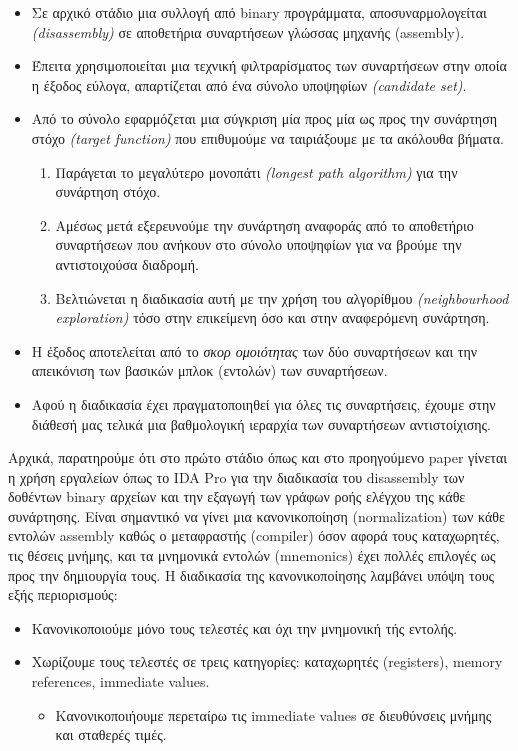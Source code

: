 \begin{itemize}
    \item Σε αρχικό στάδιο μια συλλογή από binary προγράμματα, αποσυναρμολογείται \emph{(disassembly)} σε αποθετήρια συναρτήσεων γλώσσας μηχανής (assembly).
    \item Έπειτα χρησιμοποιείται μια τεχνική φιλτραρίσματος των συναρτήσεων στην οποία η έξοδος εύλογα, απαρτίζεται από ένα σύνολο υποψηφίων \emph{(candidate set)}.
    \item Από το σύνολο εφαρμόζεται μια σύγκριση μία προς μία ως προς την συνάρτηση στόχο \emph{(target function)} που επιθυμούμε να ταιριάξουμε με τα ακόλουθα βήματα.
    \begin{enumerate}
        \item Παράγεται το μεγαλύτερο μονοπάτι \emph{(longest path algorithm)} για την συνάρτηση στόχο.
        \item Αμέσως μετά εξερευνούμε την συνάρτηση αναφοράς από το αποθετήριο συναρτήσεων που ανήκουν στο σύνολο υποψηφίων για να βρούμε την αντιστοιχούσα διαδρομή.
        \item Βελτιώνεται η διαδικασία αυτή με την χρήση του αλγορίθμου \emph{(neighbourhood exploration)} τόσο στην επικείμενη όσο και στην αναφερόμενη συνάρτηση.
    \end{enumerate}
    \item Η έξοδος αποτελείται από το \emph{σκορ ομοιότητας} των δύο συναρτήσεων και την απεικόνιση των βασικών μπλοκ (εντολών) των συναρτήσεων.
    \item Αφού η διαδικασία έχει πραγματοποιηθεί για όλες τις συναρτήσεις, έχουμε στην διάθεσή μας τελικά μια βαθμολογική ιεραρχία των συναρτήσεων αντιστοίχισης.
\end{itemize}
Αρχικά, παρατηρούμε ότι στο πρώτο στάδιο όπως και στο προηγούμενο paper γίνεται η χρήση εργαλείων όπως το IDA Pro για την διαδικασία του disassembly των δοθέντων binary αρχείων και την εξαγωγή των γράφων ροής ελέγχου της κάθε συνάρτησης.
Είναι σημαντικό να γίνει μια κανονικοποίηση (normalization) των κάθε εντολών assembly καθώς ο μεταφραστής (compiler) όσον αφορά τους καταχωρητές, τις θέσεις μνήμης, και τα μνημονικά εντολών (mnemonics) έχει πολλές επιλογές ως προς την δημιουργία τους.
Η διαδικασία της κανονικοποίησης λαμβάνει υπόψη τους εξής περιορισμούς:
\begin{itemize}
  \item Κανονικοποιούμε μόνο τους τελεστές και όχι την μνημονική τής εντολής.
  \item Χωρίζουμε τους τελεστές σε τρεις κατηγορίες: καταχωρητές (registers), memory references, immediate values.
    \begin{itemize}
      \item Κανονικοποιήουμε περεταίρω τις immediate values σε διευθύνσεις μνήμης και σταθερές τιμές.
    \end{itemize}
\end{itemize}

